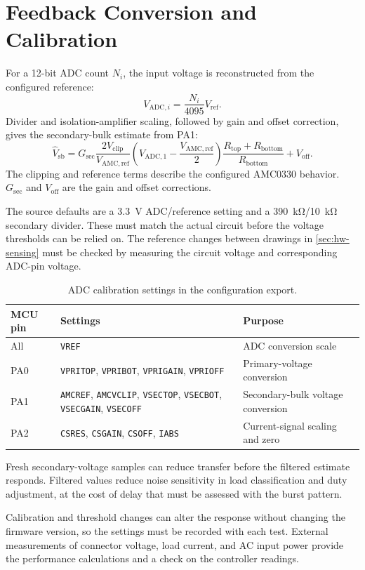 \section{Feedback Conversion and Calibration}
\label{sec:ctrl-feedback}

For a 12-bit ADC count \(N_i\), the input voltage is reconstructed from the configured reference:
\begin{equation}
 V_{\mathrm{ADC},i}=\frac{N_i}{4095}V_{\mathrm{ref}}.
 \label{eq:ctrl-adc-voltage}
\end{equation}
Divider and isolation-amplifier scaling, followed by gain and offset correction, gives the secondary-bulk estimate from PA1:
\begin{equation}
 \widehat V_{\mathrm{sb}}=
 G_{\mathrm{sec}}
 \frac{2V_{\mathrm{clip}}}{V_{\mathrm{AMC,ref}}}
 \left(V_{\mathrm{ADC},1}-\frac{V_{\mathrm{AMC,ref}}}{2}\right)
 \frac{R_{\mathrm{top}}+R_{\mathrm{bottom}}}{R_{\mathrm{bottom}}}
 +V_{\mathrm{off}}.
 \label{eq:ctrl-secondary-calibration}
\end{equation}
The clipping and reference terms describe the configured AMC0330 behavior. \(G_{\mathrm{sec}}\) and \(V_{\mathrm{off}}\) are the gain and offset corrections.

The source defaults are a \SI{3.3}{\volt} ADC/reference setting and a \SI{390}{\kilo\ohm}/\SI{10}{\kilo\ohm} secondary divider. These must match the actual circuit before the voltage thresholds can be relied on. The reference changes between drawings in \cref{sec:hw-sensing} must be checked by measuring the circuit voltage and corresponding ADC-pin voltage.

\begin{table}[htbp]
\centering
\caption{ADC calibration settings in the configuration export.}
\label{tab:fw-calibration-fields}
\begin{tabularx}{\textwidth}{@{}p{}p{}X@{}}
\toprule
MCU pin & Settings & Purpose\\
\midrule
All & \texttt{VREF} & ADC conversion scale\\
PA0 & \texttt{VPRITOP}, \texttt{VPRIBOT}, \texttt{VPRIGAIN}, \texttt{VPRIOFF} & Primary-voltage conversion\\
PA1 & \texttt{AMCREF}, \texttt{AMCVCLIP}, \texttt{VSECTOP}, \texttt{VSECBOT}, \texttt{VSECGAIN}, \texttt{VSECOFF} & Secondary-bulk voltage conversion\\
PA2 & \texttt{CSRES}, \texttt{CSGAIN}, \texttt{CSOFF}, \texttt{IABS} & Current-signal scaling and zero\\
\bottomrule
\end{tabularx}
\end{table}

Fresh secondary-voltage samples can reduce transfer before the filtered estimate responds. Filtered values reduce noise sensitivity in load classification and duty adjustment, at the cost of delay that must be assessed with the burst pattern.

Calibration and threshold changes can alter the response without changing the firmware version, so the settings must be recorded with each test. External measurements of connector voltage, load current, and AC input power provide the performance calculations and a check on the controller readings.

